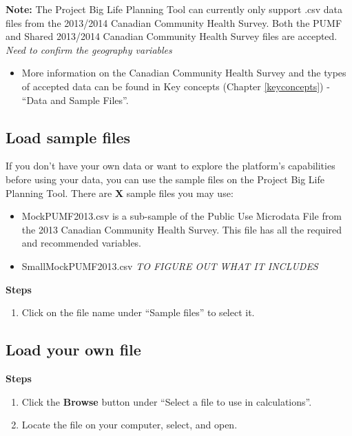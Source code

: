 \documentclass[]{book}
\providecommand{\tightlist}{%
  \setlength{\itemsep}{0pt}\setlength{\parskip}{0pt}}
\begin{document}
\textbf{Note:} The Project Big Life Planning Tool can currently only
support .csv data files from the 2013/2014 Canadian Community Health
Survey. Both the PUMF and Shared 2013/2014 Canadian Community Health
Survey files are accepted. \emph{Need to confirm the geography
variables}

\begin{itemize}
\tightlist
\item
  More information on the Canadian Community Health Survey and the types
  of accepted data can be found in Key concepts (Chapter
  \ref{keyconcepts}) - ``Data and Sample Files''.
\end{itemize}

\subsection{Load sample files}\label{load-sample-files}

If you don't have your own data or want to explore the platform's
capabilities before using your data, you can use the sample files on the
Project Big Life Planning Tool. There are \textbf{X} sample files you
may use:

\begin{itemize}
\item
  MockPUMF2013.csv is a sub-sample of the Public Use Microdata File from
  the 2013 Canadian Community Health Survey. This file has all the
  required and recommended variables.
\item
  SmallMockPUMF2013.csv \emph{TO FIGURE OUT WHAT IT INCLUDES}
\end{itemize}

\textbf{Steps}

\begin{enumerate}
\def\labelenumi{\arabic{enumi}.}
\tightlist
\item
  Click on the file name under ``Sample files'' to select it.
\end{enumerate}

\subsection{Load your own file}\label{load-your-own-file}

\textbf{Steps}

\begin{enumerate}
\def\labelenumi{\arabic{enumi}.}
\item
  Click the \textbf{Browse} button under ``Select a file to use in
  calculations''.
\item
  Locate the file on your computer, select, and open.
\end{enumerate}
\end{document}
